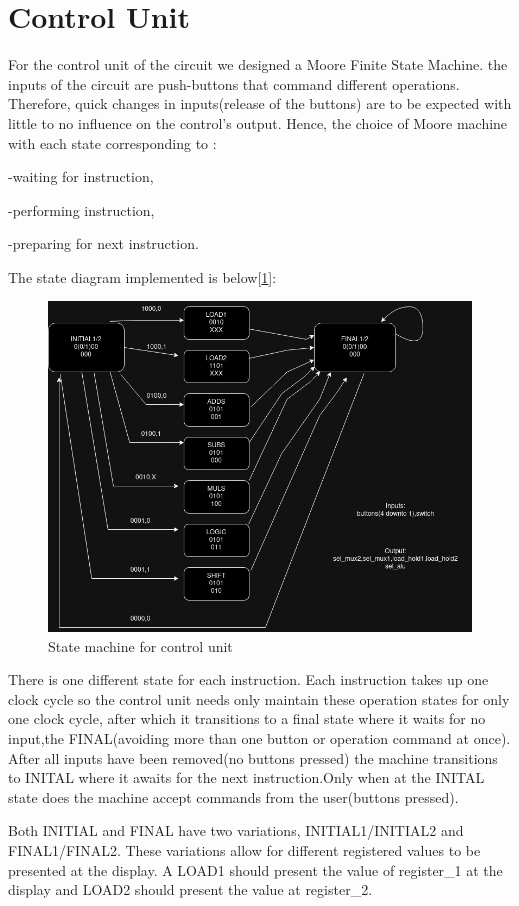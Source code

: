 \documentclass[12pt]{article}
\begin{document}
\section{Control Unit}
For the control unit of the circuit we designed a Moore Finite State Machine.
the inputs of the circuit are push-buttons that command different operations. Therefore, quick changes in inputs(release of the buttons) are to be expected with little to no influence on the control's output. Hence, the choice of Moore machine with each state corresponding to :

-waiting for instruction, 

-performing instruction,

-preparing for next instruction.

The state diagram implemented is below[\ref{fig:FSM}]:
\begin{figure}[H]
	\centering
	\includegraphics[width=0.8\linewidth]{Imagens/state_machine_lab1.jpg}
	\caption{State machine for control unit}
	\label{fig:FSM}
\end{figure}

There is one different state for each instruction. Each instruction takes up one clock cycle so the control unit needs only maintain these operation states for only one clock cycle, after which it transitions to a final state where it waits for no input,the FINAL(avoiding more than one button or operation command at once). After all inputs have been removed(no buttons pressed) the machine transitions to INITAL where it awaits for the next instruction.Only when at the INITAL state does the machine accept commands from the user(buttons pressed).

Both INITIAL and FINAL have two variations, INITIAL1/INITIAL2 and FINAL1/FINAL2. These variations allow for different registered values to be presented at the display. A LOAD1 should present the value of register\_1 at the display and LOAD2 should present the value at register\_2.
\end{document}
